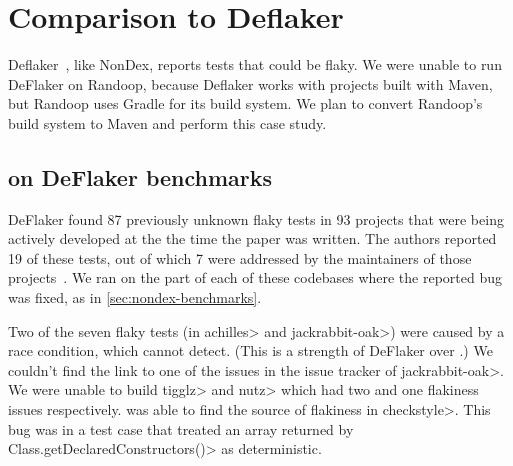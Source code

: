 \section{Comparison to Deflaker}
Deflaker~\cite{deflaker}, like NonDex, reports tests that could be flaky. 
We were unable to run DeFlaker on Randoop, because Deflaker works with
projects built with Maven, but Randoop
uses Gradle for its build system. We plan to convert Randoop's build system to Maven and
perform this case study.

\subsection{\TheDeterminismChecker on DeFlaker benchmarks}\label{sec:deflaker-benchmarks}
DeFlaker found 87 previously unknown flaky tests in 93 projects that were being actively developed at the the time
the paper was written. The authors reported 19 of these tests, out of which 7 were addressed by the maintainers of
those projects~\cite{deflaker}.
We ran \theDeterminismChecker on the part of each of these
codebases where the reported bug was fixed, as in \cref{sec:nondex-benchmarks}.

Two of the seven flaky tests (in \<achilles> and \<jackrabbit-oak>)
were caused by a race condition, which \theDeterminismChecker
cannot detect.  (This is a strength of DeFlaker over \theDeterminismChecker.)
We couldn't find the link to one of the issues in the issue tracker of \<jackrabbit-oak>.
We were unable to build \<tigglz> and \<nutz> which had two and one flakiness issues respectively.
\TheDeterminismChecker was able to find the source of flakiness in \<checkstyle>. This bug was in a test
case that treated an array returned by \<Class.getDeclaredConstructors()>
as deterministic.
